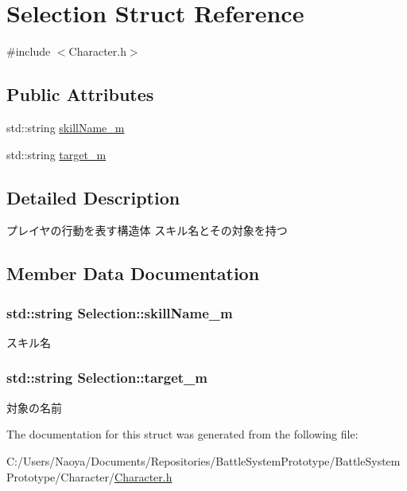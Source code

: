 \hypertarget{struct_selection}{}\section{Selection Struct Reference}
\label{struct_selection}


{\ttfamily \#include $<$Character.\+h$>$}

\subsection*{Public Attributes}
\begin{DoxyCompactItemize}
\item 
std\+::string \hyperlink{struct_selection_a8634426d66a52087240cffd66104d8b8}{skill\+Name\+\_\+m}
\item 
std\+::string \hyperlink{struct_selection_a1b21fefdc3fa3795f1c0a4701e9f8ee9}{target\+\_\+m}
\end{DoxyCompactItemize}


\subsection{Detailed Description}
プレイヤの行動を表す構造体 スキル名とその対象を持つ 

\subsection{Member Data Documentation}
\hypertarget{struct_selection_a8634426d66a52087240cffd66104d8b8}{}
\subsubsection[{skill\+Name\+\_\+m}]{\setlength{\rightskip}{0pt plus 5cm}std\+::string Selection\+::skill\+Name\+\_\+m}\label{struct_selection_a8634426d66a52087240cffd66104d8b8}
スキル名 \hypertarget{struct_selection_a1b21fefdc3fa3795f1c0a4701e9f8ee9}{}
\subsubsection[{target\+\_\+m}]{\setlength{\rightskip}{0pt plus 5cm}std\+::string Selection\+::target\+\_\+m}\label{struct_selection_a1b21fefdc3fa3795f1c0a4701e9f8ee9}
対象の名前 

The documentation for this struct was generated from the following file\+:\begin{DoxyCompactItemize}
\item 
C\+:/\+Users/\+Naoya/\+Documents/\+Repositories/\+Battle\+System\+Prototype/\+Battle\+System\+Prototype/\+Character/\hyperlink{_character_8h}{Character.\+h}\end{DoxyCompactItemize}
